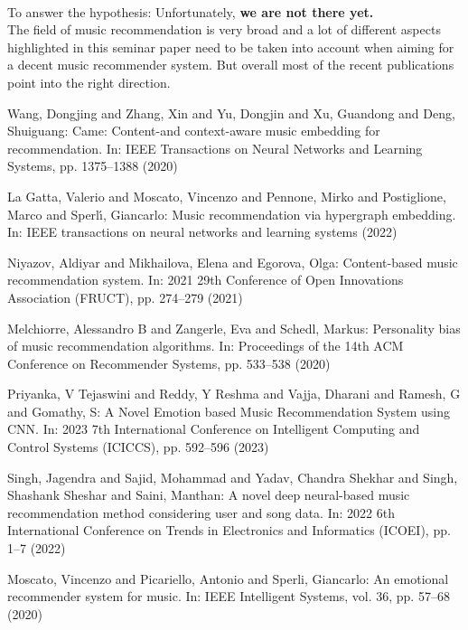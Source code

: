 \documentclass[runningheads,a4paper]{llncs}
\begin{document}
\\
To answer the hypothesis: 
Unfortunately, \textbf{we are not there yet.} \\
The field of music recommendation is very broad and a lot of different aspects highlighted in this seminar paper need to be taken into account when aiming for a decent music recommender system.
But overall most of the recent publications point into the right direction.  
\newpage
\begin{thebibliography}{4}

 Wang, Dongjing and Zhang, Xin and Yu, Dongjin and Xu, Guandong and Deng, Shuiguang: 
Came: Content-and context-aware music embedding for recommendation. In: IEEE Transactions on Neural Networks and Learning Systems,
pp. 1375--1388 (2020)

 La Gatta, Valerio and Moscato, Vincenzo and Pennone, Mirko and Postiglione, Marco and Sperl{\'\i}, Giancarlo:
Music recommendation via hypergraph embedding. In: IEEE transactions on neural networks and learning systems (2022)

 Niyazov, Aldiyar and Mikhailova, Elena and Egorova, Olga:
Content-based music recommendation system. In: 2021 29th Conference of Open Innovations Association (FRUCT),
pp. 274--279 (2021)

 Melchiorre, Alessandro B and Zangerle, Eva and Schedl, Markus:
Personality bias of music recommendation algorithms. In: Proceedings of the 14th ACM Conference on Recommender Systems, 
pp. 533--538 (2020)

 Priyanka, V Tejaswini and Reddy, Y Reshma and Vajja, Dharani and Ramesh, G and Gomathy, S:
A Novel Emotion based Music Recommendation System using CNN. In: 2023 7th International Conference on Intelligent Computing and Control Systems (ICICCS),
pp. 592--596 (2023)

 Singh, Jagendra and Sajid, Mohammad and Yadav, Chandra Shekhar and Singh, Shashank Sheshar and Saini, Manthan:
A novel deep neural-based music recommendation method considering user and song data. In: 2022 6th International Conference on Trends in Electronics and Informatics (ICOEI),
pp. 1--7 (2022)

 Moscato, Vincenzo and Picariello, Antonio and Sperli, Giancarlo:
An emotional recommender system for music. In: IEEE Intelligent Systems, vol. 36, pp. 57--68 (2020)


\end{thebibliography}
\end{document}
